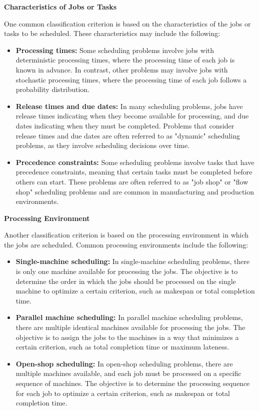 \documentclass[12pt]{book} %
\begin{document}
\textbf{Characteristics of Jobs or Tasks}

One common classification criterion is based on the characteristics of the jobs or tasks to be scheduled. These characteristics may include the following:

\begin{itemize}
    \item \textbf{Processing times:} Some scheduling problems involve jobs with deterministic processing times, where the processing time of each job is known in advance. In contrast, other problems may involve jobs with stochastic processing times, where the processing time of each job follows a probability distribution.
    
    \item \textbf{Release times and due dates:} In many scheduling problems, jobs have release times indicating when they become available for processing, and due dates indicating when they must be completed. Problems that consider release times and due dates are often referred to as "dynamic" scheduling problems, as they involve scheduling decisions over time.
    
    \item \textbf{Precedence constraints:} Some scheduling problems involve tasks that have precedence constraints, meaning that certain tasks must be completed before others can start. These problems are often referred to as "job shop" or "flow shop" scheduling problems and are common in manufacturing and production environments.
\end{itemize}

\textbf{Processing Environment}

Another classification criterion is based on the processing environment in which the jobs are scheduled. Common processing environments include the following:

\begin{itemize}
    \item \textbf{Single-machine scheduling:} In single-machine scheduling problems, there is only one machine available for processing the jobs. The objective is to determine the order in which the jobs should be processed on the single machine to optimize a certain criterion, such as makespan or total completion time.
    
    \item \textbf{Parallel machine scheduling:} In parallel machine scheduling problems, there are multiple identical machines available for processing the jobs. The objective is to assign the jobs to the machines in a way that minimizes a certain criterion, such as total completion time or maximum lateness.
    
    \item \textbf{Open-shop scheduling:} In open-shop scheduling problems, there are multiple machines available, and each job must be processed on a specific sequence of machines. The objective is to determine the processing sequence for each job to optimize a certain criterion, such as makespan or total completion time.
\end{itemize}
\end{document}
